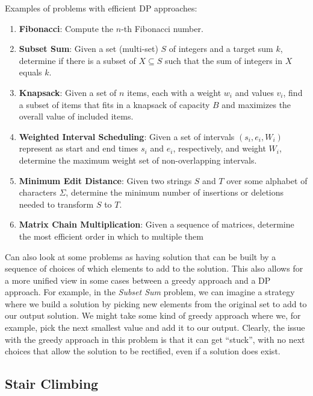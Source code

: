 \documentclass[10pt,a4paper]{article}
\begin{document}
Examples of problems with efficient DP approaches:
\begin{enumerate}
    \item \textbf{Fibonacci}: Compute the $n$-th Fibonacci number.
    \item \textbf{Subset Sum}: Given a set (multi-set) $S$ of integers and a target sum $k$, determine if there is a subset of $X \subseteq S$ such that the sum of integers in $X$ equals $k$.
    \item \textbf{Knapsack}: Given a set of $n$ items, each with a weight $w_i$ and values $v_i$, find a subset of items that fits in a knapsack of capacity $B$ and maximizes the overall value of included items.
    \item \textbf{Weighted Interval Scheduling}: Given a set of intervals $(s_i,e_i, W_i)$ represent as start and end times $s_i$ and $e_i$, respectively, and weight $W_i$, determine the maximum weight set of non-overlapping intervals.
    \item \textbf{Minimum Edit Distance}: Given two strings $S$ and $T$ over some alphabet of characters $\Sigma$, determine the minimum number of insertions or deletions needed to transform $S$ to $T$.
    \item \textbf{Matrix Chain Multiplication}: Given a sequence of matrices, determine the most efficient order in which to multiple them
\end{enumerate}


Can also look at some problems as having solution that can be built by a sequence of choices of which elements to add to the solution. This also allows for a more unified view in some cases between a greedy approach and a DP approach. For example, in the \textit{Subset Sum} problem, we can imagine a strategy where we build a solution by picking new elements from the original set to add to our output solution. We might take some kind of greedy approach where we, for example, pick the next smallest value and add it to our output. Clearly, the issue with the greedy approach in this problem is that it can get ``stuck'', with no next choices that allow the solution to be rectified, even if a solution does exist.

\subsection*{Stair Climbing}
\end{document}
